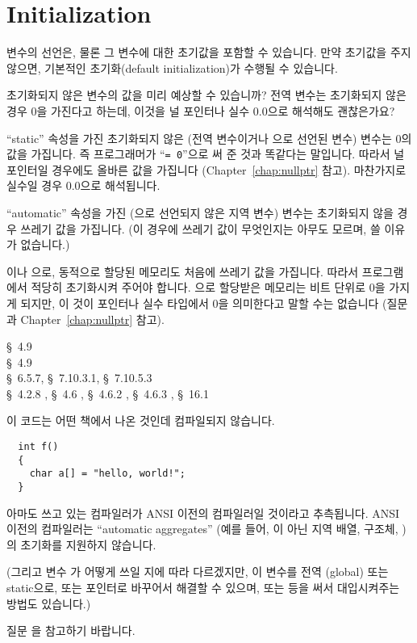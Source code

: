 \section{Initialization}	\label{sec:init}
변수의 선언은, 물론 그 변수에 대한 초기값을 포함할 수 있습니다.
만약 초기값을 주지 않으면, 기본적인 초기화(default initialization)가
수행될 수 있습니다.

\begin{faq}
	초기화되지 않은 변수의 값을 미리 예상할 수 있습니까?
	전역 변수는 초기화되지 않은 경우 0을 가진다고 하는데,
	이것을 널 포인터나 실수 0.0으로 해석해도 괜찮은가요?

\A
	``static'' 속성을 가진 초기화되지 않은 (전역 변수이거나
	으로 선언된 변수) 변수는 0의 값을 가집니다.
	즉 프로그래머가 ``\verb+= 0+''으로 써 준 것과 똑같다는
	말입니다.  따라서 널 포인터일 경우에도 올바른 값을
	가집니다 (Chapter~\ref{chap:nullptr} 참고).
        마찬가지로 실수일 경우 0.0으로 해석됩니다.

	``automatic'' 속성을 가진 (으로 선언되지 않은
	지역 변수) 변수는 초기화되지 않을 경우 쓰레기 값을
	가집니다.  (이 경우에 쓰레기 값이 무엇인지는 아무도 모르며,
	쓸 이유가 없습니다.)

	이나 으로, 동적으로 할당된 메모리도
	처음에 쓰레기 값을 가집니다.  따라서 프로그램에서
	적당히 초기화시켜 주어야 합니다.  으로 할당받은
	메모리는 비트 단위로 0을 가지게 되지만, 이 것이
	포인터나 실수 타입에서 0을 의미한다고 말할 수는 없습니다
	(질문 과 Chapter~\ref{chap:nullptr} 참고).

\R
	\cite{kr1} \S\ 4.9  \\
	\cite{kr2} \S\ 4.9  \\
	\cite{c89} \S\ 6.5.7, \S\ 7.10.3.1, \S\ 7.10.5.3 \\
	\cite{hs} \S\ 4.2.8 , \S\ 4.6 , 
		\S\ 4.6.2 , \S\ 4.6.3 , 
		\S\ 16.1 
\end{faq}

\begin{faq}
	이 코드는 어떤 책에서 나온 것인데 컴파일되지 않습니다.

\begin{verbatim}
  int f()
  {
    char a[] = "hello, world!";
  }
\end{verbatim}

\A
	아마도 쓰고 있는 컴파일러가 ANSI 이전의 컴파일러일 것이라고
	추측됩니다.  ANSI 이전의 컴파일러는 ``automatic aggregates''
	(예를 들어,
	이 아닌 지역 배열, 구조체, )의
	초기화를 지원하지 않습니다.

	(그리고 변수 가 어떻게 쓰일 지에 따라
	다르겠지만, 이 변수를 전역 (global) 또는 static으로, 또는
	포인터로 바꾸어서 해결할 수 있으며, 또는  등을 써서 
	대입시켜주는 방법도 있습니다.) 

	질문 을 참고하기 바랍니다.
\end{faq}

